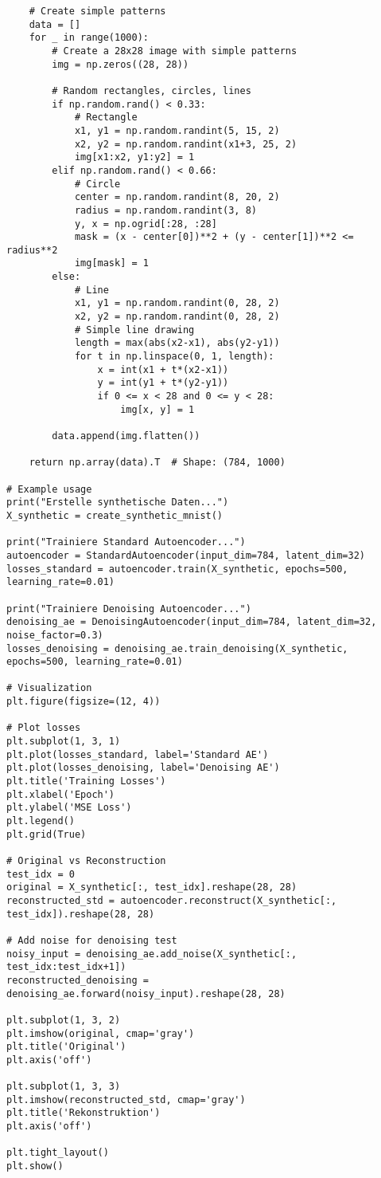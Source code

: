 ﻿\documentclass[12pt,a4paper]{article}
\begin{document}
\begin{lstlisting}
    # Create simple patterns
    data = []
    for _ in range(1000):
        # Create a 28x28 image with simple patterns
        img = np.zeros((28, 28))
        
        # Random rectangles, circles, lines
        if np.random.rand() < 0.33:
            # Rectangle
            x1, y1 = np.random.randint(5, 15, 2)
            x2, y2 = np.random.randint(x1+3, 25, 2)
            img[x1:x2, y1:y2] = 1
        elif np.random.rand() < 0.66:
            # Circle
            center = np.random.randint(8, 20, 2)
            radius = np.random.randint(3, 8)
            y, x = np.ogrid[:28, :28]
            mask = (x - center[0])**2 + (y - center[1])**2 <= radius**2
            img[mask] = 1
        else:
            # Line
            x1, y1 = np.random.randint(0, 28, 2)
            x2, y2 = np.random.randint(0, 28, 2)
            # Simple line drawing
            length = max(abs(x2-x1), abs(y2-y1))
            for t in np.linspace(0, 1, length):
                x = int(x1 + t*(x2-x1))
                y = int(y1 + t*(y2-y1))
                if 0 <= x < 28 and 0 <= y < 28:
                    img[x, y] = 1
        
        data.append(img.flatten())
    
    return np.array(data).T  # Shape: (784, 1000)

# Example usage
print("Erstelle synthetische Daten...")
X_synthetic = create_synthetic_mnist()

print("Trainiere Standard Autoencoder...")
autoencoder = StandardAutoencoder(input_dim=784, latent_dim=32)
losses_standard = autoencoder.train(X_synthetic, epochs=500, learning_rate=0.01)

print("Trainiere Denoising Autoencoder...")
denoising_ae = DenoisingAutoencoder(input_dim=784, latent_dim=32, noise_factor=0.3)
losses_denoising = denoising_ae.train_denoising(X_synthetic, epochs=500, learning_rate=0.01)

# Visualization
plt.figure(figsize=(12, 4))

# Plot losses
plt.subplot(1, 3, 1)
plt.plot(losses_standard, label='Standard AE')
plt.plot(losses_denoising, label='Denoising AE')
plt.title('Training Losses')
plt.xlabel('Epoch')
plt.ylabel('MSE Loss')
plt.legend()
plt.grid(True)

# Original vs Reconstruction
test_idx = 0
original = X_synthetic[:, test_idx].reshape(28, 28)
reconstructed_std = autoencoder.reconstruct(X_synthetic[:, test_idx]).reshape(28, 28)

# Add noise for denoising test
noisy_input = denoising_ae.add_noise(X_synthetic[:, test_idx:test_idx+1])
reconstructed_denoising = denoising_ae.forward(noisy_input).reshape(28, 28)

plt.subplot(1, 3, 2)
plt.imshow(original, cmap='gray')
plt.title('Original')
plt.axis('off')

plt.subplot(1, 3, 3)
plt.imshow(reconstructed_std, cmap='gray')
plt.title('Rekonstruktion')
plt.axis('off')

plt.tight_layout()
plt.show()
\end{lstlisting}
\end{document}

